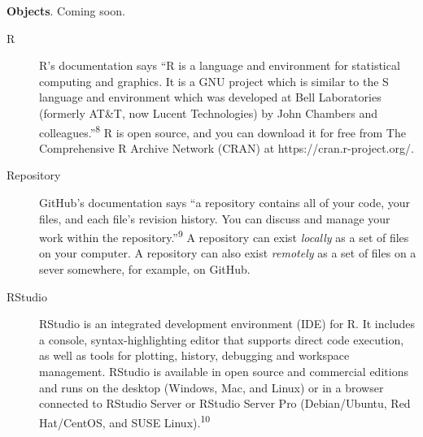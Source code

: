 \documentclass[
  letterpaper,
  DIV=11,
  numbers=noendperiod]{scrreprt}
\begin{document}
\textbf{Objects}. Coming soon.

\begin{description}
\item[\label{glossary-r}{R}]
R's documentation says ``R is a language and environment for statistical
computing and graphics. It is a GNU project which is similar to the S
language and environment which was developed at Bell Laboratories
(formerly AT\&T, now Lucent Technologies) by John Chambers and
colleagues.''\textsuperscript{8} R is open source, and you can download
it for free from The Comprehensive R Archive Network (CRAN) at
https://cran.r-project.org/.
\item[\label{glossary-repository}{Repository}]
GitHub's documentation says ``a repository contains all of your code,
your files, and each file's revision history. You can discuss and manage
your work within the repository.''\textsuperscript{9} A repository can
exist \emph{locally} as a set of files on your computer. A repository
can also exist \emph{remotely} as a set of files on a sever somewhere,
for example, on GitHub.
\item[\label{glossary-rstudio}{RStudio}]
RStudio is an integrated development environment (IDE) for R. It
includes a console, syntax-highlighting editor that supports direct code
execution, as well as tools for plotting, history, debugging and
workspace management. RStudio is available in open source and commercial
editions and runs on the desktop (Windows, Mac, and Linux) or in a
browser connected to RStudio Server or RStudio Server Pro
(Debian/Ubuntu, Red Hat/CentOS, and SUSE Linux).\textsuperscript{10}
\end{description}
\end{document}
